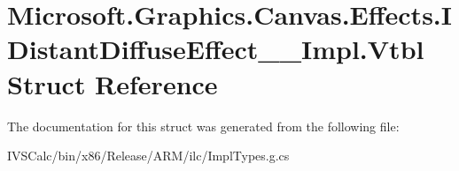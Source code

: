 \hypertarget{struct_microsoft_1_1_graphics_1_1_canvas_1_1_effects_1_1_i_distant_diffuse_effect_____impl_1_1_vtbl}{}\section{Microsoft.\+Graphics.\+Canvas.\+Effects.\+I\+Distant\+Diffuse\+Effect\+\_\+\+\_\+\+Impl.\+Vtbl Struct Reference}
\label{struct_microsoft_1_1_graphics_1_1_canvas_1_1_effects_1_1_i_distant_diffuse_effect_____impl_1_1_vtbl}


The documentation for this struct was generated from the following file\+:\begin{DoxyCompactItemize}
\item 
I\+V\+S\+Calc/bin/x86/\+Release/\+A\+R\+M/ilc/Impl\+Types.\+g.\+cs\end{DoxyCompactItemize}
